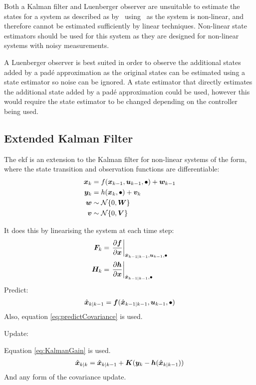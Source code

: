 Both a Kalman filter and Luenberger observer are unsuitable to estimate the states for a system as described as by~ using~ as the system is non-linear, and therefore cannot be estimated sufficiently by linear techniques. 
Non-linear state estimators should be used for this system as they are designed for non-linear systems with noisy measurements.

A Luenberger observer is best suited in order to observe the additional states added by a padé approximation as the original states can be estimated using a state estimator so noise can be ignored. 
A state estimator that directly estimates the additional state added by a padé approximation could be used, however this would require the state estimator to be changed depending on the controller being used. 
%
\subsection{Extended Kalman Filter}

The \gls{ekf} is an extension to the Kalman filter for non-linear systems of the form, where the state transition and observation functions are differentiable:
\begin{align}
    \bm x_k &= f(\bm x_{k-1}, \bm u_{k-1}, \bullet) + \bm w_{k-1} \\
    \bm y_k &= h(\bm x_k, \bullet) + \bm v_k \\
    \bm w &\sim \mathcal{N} \{0,\bm{W}\} \\
    \bm v &\sim \mathcal{N} \{0,\bm{V}\}
\end{align}

It does this by linearising the system at each time step:
\begin{align}
    \bm F_k &= \left.\frac{\partial\bm f}{\partial\bm x}\right|_{\hat{\bm{x}}_{k-1 \mid k-1}, \bm u_{k-1}, \bullet} \\
    \bm H_k &= \left.\frac{\partial\bm h}{\partial\bm x}\right|_{\hat{\bm{x}}_{k-1 \mid k-1}, \bullet}
\end{align}
Predict:
\begin{align}
    \hat{\bm{x}}_{k \mid k-1} = \bm f(\hat{\bm{x}}_{k-1 \mid k-1}, \bm u_{k-1}, \bullet)
\end{align}
Also, equation \eqref{eq:predictCovariance} is used.

Update:

Equation \eqref{eq:KalmanGain} is used.
\begin{align}
    \hat{\bm{x}}_{k \mid k} = \hat{\bm{x}}_{k \mid k-1} + \bm K (\bm y_k - \bm h(\hat{\bm{x}}_{k \mid k-1}))
\end{align}
And any form of the covariance update.

